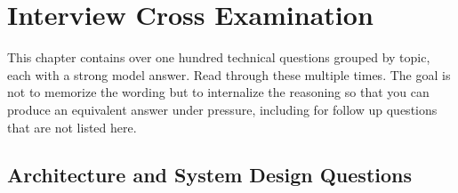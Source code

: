 \documentclass[11pt,a4paper]{report}
\begin{document}
\chapter{Interview Cross Examination}

This chapter contains over one hundred technical questions grouped by topic, each with a strong model answer. Read through these multiple times. The goal is not to memorize the wording but to internalize the reasoning so that you can produce an equivalent answer under pressure, including for follow up questions that are not listed here.

\section{Architecture and System Design Questions}
\end{document}
